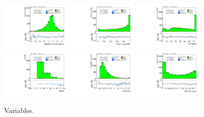 \begin{figure}[!htpb]
  \includegraphics[width=0.30\textwidth]{figures/analysis/vbf-QCDCR/jets-etaprod}
  \includegraphics[width=0.30\textwidth]{figures/analysis/vbf-QCDCR/lep-eta-centrality}
  \includegraphics[width=0.30\textwidth]{figures/analysis/vbf-QCDCR/system-pt} \\
  \includegraphics[width=0.30\textwidth]{figures/analysis/vbf-QCDCR/n-jets30}
  \includegraphics[width=0.30\textwidth]{figures/analysis/vbf-QCDCR/dijet-m-veryhigh}
  \includegraphics[width=0.30\textwidth]{figures/analysis/vbf-QCDCR/BDTEve-VBF} \\
  \caption{Variables.}
  \label{fig:backgrounds-QCDCR-jets}
\end{figure}

